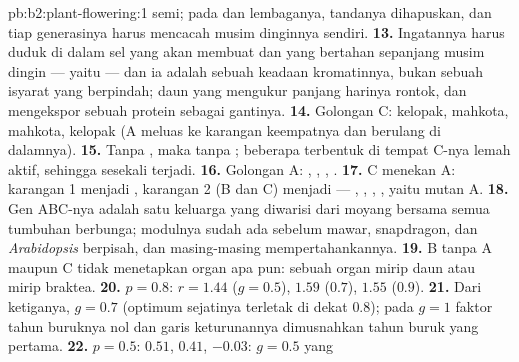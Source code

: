 \begin{solution}{pb:b2:plant-flowering:1}
semi; pada  dan lembaganya, tandanya dihapuskan, dan tiap
generasinya harus mencacah musim dinginnya sendiri.
\textbf{13.} Ingatannya harus duduk di dalam sel yang akan membuat
 dan yang bertahan sepanjang musim dingin --- yaitu 
--- dan ia adalah sebuah keadaan kromatinnya, bukan sebuah isyarat yang
berpindah; daun yang mengukur panjang harinya rontok, dan mengekspor
sebuah protein sebagai gantinya.
\textbf{14.} Golongan C: kelopak, mahkota, mahkota, kelopak (A meluas ke
karangan keempatnya dan  berulang di dalamnya).
\textbf{15.} Tanpa , maka tanpa ; beberapa  terbentuk di tempat C-nya lemah aktif, sehingga sesekali 
terjadi.
\textbf{16.} Golongan A: , , , .
\textbf{17.} C menekan A: karangan 1 menjadi , karangan 2 (B
dan C) menjadi  --- , , ,
, yaitu  mutan A.
\textbf{18.} Gen ABC-nya adalah satu keluarga  yang
diwarisi dari moyang bersama semua tumbuhan berbunga; modulnya sudah
ada sebelum mawar, snapdragon, dan \emph{Arabidopsis} berpisah, dan
masing-masing mempertahankannya.
\textbf{19.} B tanpa A maupun C tidak menetapkan organ  apa pun:
sebuah organ mirip daun atau mirip braktea.
\textbf{20.} $p = 0.8$: $r = 1.44$ ($g = 0.5$), $1.59$ ($0.7$), $1.55$
($0.9$).
\textbf{21.} Dari ketiganya, $g = 0.7$ (optimum sejatinya terletak di
dekat $0.8$); pada $g = 1$ faktor tahun buruknya nol dan garis
keturunannya dimusnahkan tahun buruk yang pertama.
\textbf{22.} $p = 0.5$: $0.51$, $0.41$, $-0.03$: $g = 0.5$ yang

\end{solution}
